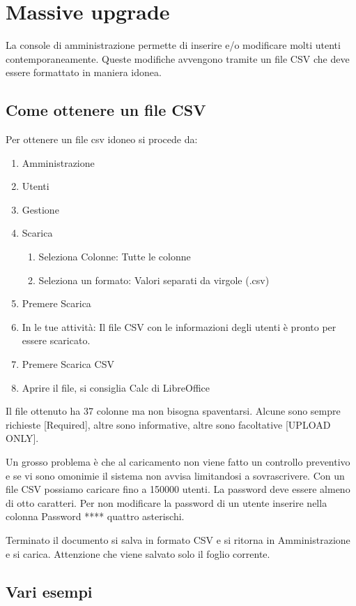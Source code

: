 \chapter{Massive upgrade}
La console di amministrazione permette di inserire e/o modificare molti utenti contemporaneamente. Queste modifiche avvengono tramite un file CSV\cite{Google2023h} che deve essere formattato in maniera idonea.
\section{Come ottenere un file CSV}
Per ottenere un file csv idoneo si procede da:
\begin{enumerate}
	\item Amministrazione
	\item Utenti
	\item Gestione
	\item Scarica
	\begin{enumerate}
		\item Seleziona Colonne: Tutte le colonne
		\item Seleziona un formato: Valori separati da virgole (.csv)
	\end{enumerate}
	\item Premere Scarica
	\item In le tue attività: Il file CSV con le informazioni degli utenti è pronto per essere scaricato.
	\item Premere Scarica CSV
	\item Aprire il file, si consiglia Calc di LibreOffice
\end{enumerate}

Il file ottenuto ha 37 colonne ma non bisogna spaventarsi. Alcune  sono sempre richieste [Required], altre sono informative, altre sono facoltative [UPLOAD ONLY]. 

Un grosso problema è che al caricamento non viene fatto un controllo preventivo e se vi sono omonimie il sistema non avvisa limitandosi a sovrascrivere. Con un file CSV possiamo caricare fino a 150000 utenti. La password deve essere almeno di otto caratteri. Per non modificare la password di un utente inserire nella colonna Password **** quattro asterischi.

Terminato il documento si salva in formato CSV e si ritorna in Amministrazione e si carica. Attenzione che viene salvato solo il foglio corrente.
\section{Vari esempi}
